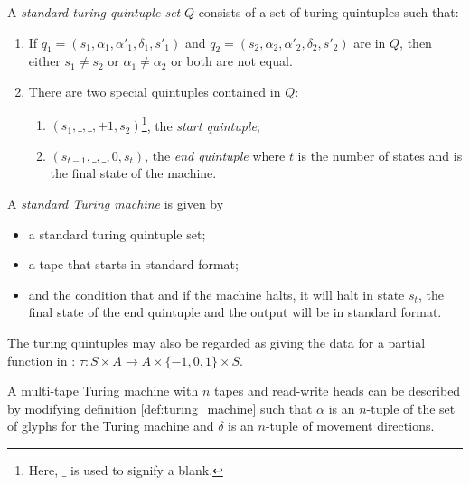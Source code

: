 \begin{definition}
  A \emph{standard turing quintuple set} $Q$ consists of a set of turing quintuples
  such that:
  \begin{enumerate}
    \item If $q_1 = (s_1,\alpha_1,\alpha'_1,\delta_1,s'_1)$ and
      $q_2 = (s_2,\alpha_2,\alpha'_2,\delta_2,s'_2)$ are in $Q$, then either
      $s_1 \ne s_2$ or $\alpha_1\ne \alpha_2$ or both are not equal.
    \item There are two special  quintuples contained in $Q$:
      \begin{enumerate}
        \item $(s_1,\_,\_,+1,s_2)$\footnote{Here, $\_$ is used to signify a blank.},
          the \emph{start quintuple};
        \item $(s_{t-1}, \_, \_, 0, s_{t})$, the \emph{end quintuple} where
        $t$ is the number of states and is the final state of the machine.
      \end{enumerate}
  \end{enumerate}
\end{definition}

\begin{definition}\label{def:turing_machine}
  A \emph{standard Turing machine} is given by
  \begin{itemize}
    \item a standard turing quintuple set;
    \item a tape that starts in standard format;
    \item and the condition that   and if the machine halts, it will halt in state
      $s_t$, the final state of the end quintuple and the output will be in standard format.
  \end{itemize}
\end{definition}

The turing quintuples may also be regarded as giving the data for a partial
function in \sets: $\tau:S\times A \to A\times\{-1,0,1\}\times S$.
\begin{remark}
  A multi-tape Turing machine with $n$ tapes and read-write heads
  can be described by modifying
  definition \vref{def:turing_machine} such that $\alpha$ is an $n$-tuple
  of the set of glyphs for the Turing machine and $\delta$ is an
  $n$-tuple of movement directions.
\end{remark}

